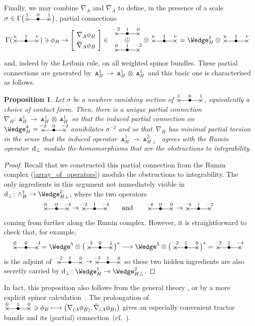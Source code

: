 \documentclass[10pt,a4paper]{amsart}
\numberwithin{equation}{section}
\newtheorem{prop}[Theorem]{Proposition}
 { \theoremstyle{definition}
\newtheorem{Definition}[Theorem]{Definition}
\newtheorem{Note}[Theorem]{Note}
\newtheorem{Example}[Theorem]{Example}
\newtheorem{Remark}[Theorem]{Remark} }
\newcommand{\xox}[3]{\begin{picture}(40,11)
\put(4,1.5){\makebox(0,0){$\times$}}
\put(20,1.5){\makebox(0,0){$\bullet$}}
\put(36,1.5){\makebox(0,0){$\times$}}
\put(4,1.5){\line(1,0){32}}
\put(4,8){\makebox(0,0){$\scriptstyle #1$}}
\put(20,8){\makebox(0,0){$\scriptstyle #2$}}
\put(36,8){\makebox(0,0){$\scriptstyle #3$}}
\end{picture}}
\begin{document}
Finally, we may combine $\nabla_A$ and $\bar\nabla_A$ to define, in the
presence of a scale $\sigma\in\Gamma\big(\xox{1}{0}{1}\big)$, partial connections
\[\Gamma(\xox{u}{1}{v})\ni\phi_B\to
\left[\!\begin{array}{c}\nabla_A\phi_B\\[3pt]
\bar\nabla_A\phi_B\end{array}\!\right]
\in\begin{array}{c}\xox{-2}{1}{0}\\[-2pt] \oplus\\[-1pt]
\xox{0}{1}{-2}\end{array}\!\!\otimes\xox{u}{1}{v}
=\Wedge_H^1\otimes\xox{u}{1}{v}\]
and, indeed by the Leibniz rule, on all weighted spinor bundles. These partial
connections are generated by $\Wedge_H^1\to\Wedge_H^1\otimes\Wedge_H^1$ and
this basic one is characterised as follows.

\begin{prop}\label{prop6}
Let $\sigma$ be a nowhere vanishing section of $\xox{1}{0}{1}$,
equivalently a choice of contact form. Then, there is a unique partial
connection $\nabla_H\colon \Wedge_H^1\to\Wedge_H^1\otimes\Wedge_H^1$ so that the
induced partial connection on $\Wedge_H^4=\xox{-2}{0}{-2}$ annihilates
$\sigma^{-2}$ and so that~$\nabla_H$ has minimal partial torsion in the sense
that the induced operator $\Wedge_H^1\to\Wedge_{H\perp}^2$ agrees with the
Rumin operator~${\rm d}_\perp$ modulo the homomorphisms that are the obstructions to
integrability.
\end{prop}

\begin{proof} Recall that we constructed this partial connection from the Rumin
complex (\ref{array_of_operators}) modulo the obstructions to integrability.
The only ingredients in this argument not immediately visible in
${\rm d}_\perp\colon \wedge_H^1\to\Wedge_{H\perp}^2$, where the two operators
\[\xox{0}{0}{-4}\to\xox{-2}{1}{-4}\qquad\mbox{and}\qquad
\xox{-4}{0}{0}\to\xox{-4}{1}{-2}\]
coming from further along the Rumin complex. However, it is straightforward to
check that, for example,
\[\xox{0}{0}{-4}=\Wedge^5\otimes\big(\,\xox{-3}{0}{1}\big)^*\longrightarrow
\Wedge^5\otimes\big(\,\xox{-2}{1}{0}\big)^*=\xox{-2}{1}{-4}\]
is the adjoint of $\;\xox{-2}{1}{0}\to\xox{-3}{1}{0}$ so these two hidden
ingredients are also secretly carried by
${\rm d}_\perp\colon \Wedge_H^1\to\Wedge_{H\perp}^2$.
\end{proof}

In fact, this proposition also follows from the general theory \cite{CS}, or by
a more explicit spinor calculation~\cite{Moy}. The prolongation of
$\xox{0}{1}{0}\ni\phi_B\longmapsto
\big(\nabla_{(A}\phi_{B)},\bar\nabla_{(A}\phi_{B)}\big)$ gives an especially convenient
tractor bundle and its (partial) connection~(cf.~\cite{CS,Moy}).
\end{document}
